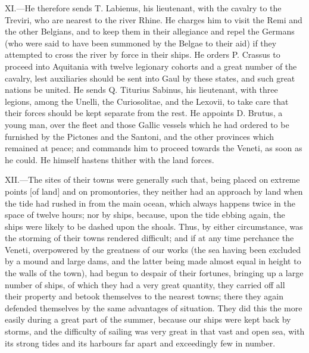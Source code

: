 XI.—He therefore sends T. Labienus, his lieutenant, with the cavalry to
the Treviri, who are nearest to the river Rhine. He charges him to visit
the Remi and the other Belgians, and to keep them in their allegiance
and repel the Germans (who were said to have been summoned by the Belgae
to their aid) if they attempted to cross the river by force in their
ships. He orders P. Crassus to proceed into Aquitania with twelve
legionary cohorts and a great number of the cavalry, lest auxiliaries
should be sent into Gaul by these states, and such great nations be
united. He sends Q. Titurius Sabinus, his lieutenant, with three
legions, among the Unelli, the Curiosolitae, and the Lexovii, to take
care that their forces should be kept separate from the rest. He
appoints D. Brutus, a young man, over the fleet and those Gallic vessels
which he had ordered to be furnished by the Pictones and the Santoni,
and the other provinces which remained at peace; and commands him to
proceed towards the Veneti, as soon as he could. He himself hastens
thither with the land forces.

XII.—The sites of their towns were generally such that, being placed on
extreme points [of land] and on promontories, they neither had an
approach by land when the tide had rushed in from the main ocean, which
always happens twice in the space of twelve hours; nor by ships,
because, upon the tide ebbing again, the ships were likely to be dashed
upon the shoals. Thus, by either circumstance, was the storming of their
towns rendered difficult; and if at any time perchance the Veneti,
overpowered by the greatness of our works (the sea having been excluded
by a mound and large dams, and the latter being made almost equal in
height to the walls of the town), had begun to despair of their
fortunes, bringing up a large number of ships, of which they had a very
great quantity, they carried off all their property and betook
themselves to the nearest towns; there they again defended themselves by
the same advantages of situation. They did this the more easily during a
great part of the summer, because our ships were kept back by storms,
and the difficulty of sailing was very great in that vast and open sea,
with its strong tides and its harbours far apart and exceedingly few in
number.

